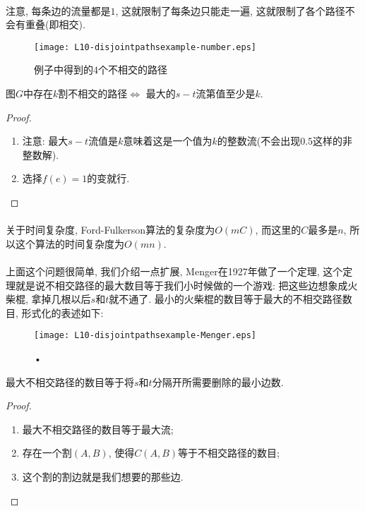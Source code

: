         \paragraph{}注意, 每条边的流量都是$1$, 这就限制了每条边只能走一遍, 这就限制了各个路径不会有重叠(即相交).
        \begin{figure}[h]
            \centering
            \texttt{[image: L10-disjointpathsexample-number.eps]}
            \caption{例子中得到的$4$个不相交的路径}
            \label{Figure: disjoint_path_example_number}
    \end{figure}
\begin{theorem}
图$G$中存在$k$割不相交的路径$\Leftrightarrow$ 最大的$s-t$流第值至少是$k$.
\end{theorem}
\begin{proof}
 \begin{enumerate}
  \item 注意: 最大$s-t$流值是$k$意味着这是一个值为$k$的整数流(不会出现$0.5$这样的非整数解).
  \item 选择$f(e) = 1$的变就行.
 \end{enumerate}
\end{proof}
            \paragraph{}关于时间复杂度, Ford-Fulkerson算法的复杂度为$O(mC)$, 而这里的$C$最多是$n$, 所以这个算法的时间复杂度为$O( mn)$.
            \paragraph{}上面这个问题很简单, 我们介绍一点扩展, Menger在1927年做了一个定理, 这个定理就是说不相交路径的最大数目等于我们小时候做的一个游戏: 把这些边想象成火柴棍, 拿掉几根以后$s$和$t$就不通了. 最小的火柴棍的数目等于最大的不相交路径数目, 形式化的表述如下:
            \begin{figure}[h]
                \centering
                \texttt{[image: L10-disjointpathsexample-Menger.eps]}
                \caption{•}
            \end{figure}
\begin{theorem}
最大不相交路径的数目等于将$s$和$t$分隔开所需要删除的最小边数.
\end{theorem}
\begin{proof}
 \begin{enumerate}
  \item 最大不相交路径的数目等于最大流;
  \item 存在一个割$(A,B)$, 使得$C(A,B)$等于不相交路径的数目;
  \item 这个割的割边就是我们想要的那些边.
 \end{enumerate}
\end{proof}
